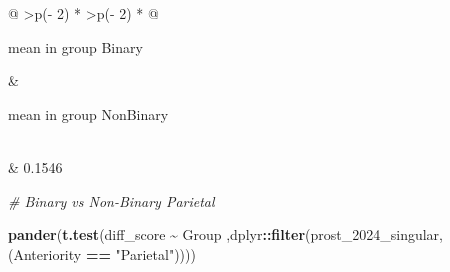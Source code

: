 \documentclass[
]{article}
\newenvironment{Shaded}{\begin{snugshade}}{\end{snugshade}}
\newcommand{\CommentTok}[1]{\textcolor[rgb]{0.56,0.35,0.01}{\textit{#1}}}
\newcommand{\FunctionTok}[1]{\textcolor[rgb]{0.13,0.29,0.53}{\textbf{#1}}}
\newcommand{\NormalTok}[1]{#1}
\newcommand{\SpecialCharTok}[1]{\textcolor[rgb]{0.81,0.36,0.00}{\textbf{#1}}}
\newcommand{\StringTok}[1]{\textcolor[rgb]{0.31,0.60,0.02}{#1}}
\begin{document}
\begin{longtable}[]{@{}
  >{\centering\arraybackslash}p{(\columnwidth - 2\tabcolsep) * }
  >{\centering\arraybackslash}p{(\columnwidth - 2\tabcolsep) * }@{}}
\toprule\noalign{}
\begin{minipage}[b]{\linewidth}\centering
mean in group Binary
\end{minipage} & \begin{minipage}[b]{\linewidth}\centering
mean in group NonBinary
\end{minipage} \\
\midrule\noalign{}
\endhead
\bottomrule\noalign{}
 & 0.1546 \\
\end{longtable}

\begin{Shaded}
\begin{Highlighting}[]
\CommentTok{\# Binary vs Non{-}Binary Parietal}

\FunctionTok{pander}\NormalTok{(}\FunctionTok{t.test}\NormalTok{(diff\_score }\SpecialCharTok{\textasciitilde{}}\NormalTok{ Group}
\NormalTok{       ,dplyr}\SpecialCharTok{::}\FunctionTok{filter}\NormalTok{(prost\_2024\_singular, (Anteriority }\SpecialCharTok{==} \StringTok{"Parietal"}\NormalTok{))))}
\end{Highlighting}
\end{Shaded}
\end{document}
